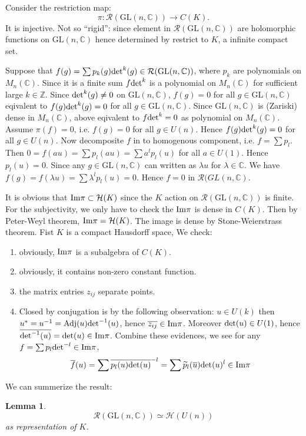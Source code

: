 \documentclass[12pt]{amsart}
\newtheorem{lemma}{Lemma}
\def\Im{{\rm Im}}
\def\bZ{{\mathbb{Z}}}
\def\bC{{\mathbb{C}}}
\def\det{{\rm det}}
\def\chh{\mathcal{H}}
\def\crr{\mathcal{R}}
\def\GL{\mathrm{GL}}
\begin{document}
Consider the restriction map:
\[
\pi:\crr(\GL(n,\bC)) \to C(K).
\]
It is injective.
Not so ``rigid'': since element in $\crr(\GL(n,\bC))$ are holomorphic functions
on $\GL(n,\bC)$ hence determined by restrict to $K$, a infinite compact set. 

Suppose that $f(g) = \sum p_k(g) \det^k(g) \in \crr(\GL(n,\bC))$, where
$p_k$ are polynomials on $M_n(\bC)$. Since it is a 
finite sum $f\det^k$ is a polynomial on $M_n(\bC)$ 
for sufficient large $k\in \bZ$.
Since  $\det^k(g)\neq 0$ on $\GL(n,\bC)$,
$f(g) = 0$ for all $g\in \GL(n,\bC)$ eqivalent to $f(g)\det^k(g) = 0$
for all $g\in \GL(n,\bC)$. 
Since $\GL(n,\bC)$ is (Zariski) dense in $M_n(\bC)$, above eqivalent to 
$f\det^k=0$ as polynomial on $M_n(\bC)$. 
Assume $\pi(f)=0$, i.e. $f(g) = 0$ for all $g\in U(n)$. Hence 
$f(g)\det^k(g)=0$ for all $g\in U(n)$. 
Now decomposite $f$ in to homogenous component, i.e. $f=\sum p_l$. 
Then $0=f(au)=\sum p_l(au) =\sum a^l p_l(u)$ for all $a\in U(1)$. Hence
$p_l(u) =0$. Since any $g\in \GL(n,\bC)$ can written as $\lambda u$ for 
$\lambda \in \bC$. We have $f(g) = f(\lambda u) = \sum \lambda^l p_l(u) = 0$. 
Hence $f=0$ in $\crr(GL(n,\bC)$.

It is obvious that $\Im \pi \subset \chh(K)$
 since the $K$ action on $\crr(\GL(n,\bC))$ is finite. 
For the subjectivity, we only have to check the $\Im \pi$ is dense in $C(K)$. 
Then by Peter-Weyl theorem, $\Im \pi=\chh(K)$. 
The image is dense by Stone-Weierstrass theorem. 
Fist $K$ is a compact Hausdorff space, 
We check:
\begin{enumerate}[(1)]
\item obviously, $\Im \pi$ is a subalgebra of $C(K)$.
\item obviously, it contains non-zero constant function.
\item the matrix entries $z_{ij}$ separate points.
\item Closed by conjugation is by the following observation: 
$u\in U(k)$ then $u^* = u^{-1} = {\rm Adj}(u) \det^{-1}(u)$, hence 
$\overline{z_{ij}} \in \Im\pi$. Moreover $\det(u)\in U(1)$, hence
$\overline{\det^{-1}(u)} = \det(u) \in \Im\pi$.
Combine these evidences, we see for any $f = \sum p_l \det^{-l} \in \Im \pi$,
\[
\overline{f}(u) = \sum \overline{p_l(u)}\overline{\det(u)}^{-l}
= \sum \widetilde{p}_l(\overline{u})\det(u)^l \in \Im \pi
\]  
\end{enumerate}

We can summerize the result:

\begin{lemma}
\[
\crr(\GL(n,\bC)) \simeq \chh(U(n))
\]
as representation of $K$. 
\end{lemma}
\end{document}

